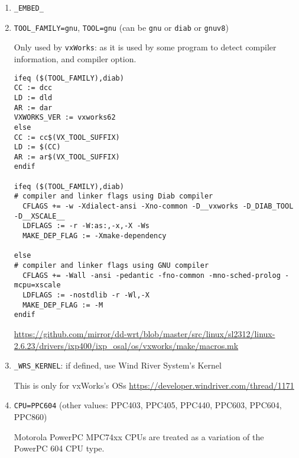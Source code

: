 \begin{enumerate}
  
  \item \verb!_EMBED_!
  
  \item \verb!TOOL_FAMILY=gnu!, \verb!TOOL=gnu! (can be \verb!gnu! or
  \verb!diab! or \verb!gnuv8!)
  
Only used by \verb!vxWorks!: as it is used by some program to detect compiler information, and compiler option.
\begin{verbatim}
ifeq ($(TOOL_FAMILY),diab)
CC := dcc
LD := dld
AR := dar
VXWORKS_VER := vxworks62
else
CC := cc$(VX_TOOL_SUFFIX)
LD := $(CC)
AR := ar$(VX_TOOL_SUFFIX)
endif

ifeq ($(TOOL_FAMILY),diab)
# compiler and linker flags using Diab compiler
  CFLAGS += -w -Xdialect-ansi -Xno-common -D__vxworks -D_DIAB_TOOL -D__XSCALE__
  LDFLAGS := -r -W:as:,-x,-X -Ws
  MAKE_DEP_FLAG := -Xmake-dependency

else
# compiler and linker flags using GNU compiler
  CFLAGS += -Wall -ansi -pedantic -fno-common -mno-sched-prolog -mcpu=xscale
  LDFLAGS := -nostdlib -r -Wl,-X
  MAKE_DEP_FLAG := -M
endif
\end{verbatim}
\url{https://github.com/mirror/dd-wrt/blob/master/src/linux/sl2312/linux-2.6.23/drivers/ixp400/ixp_osal/os/vxworks/make/macros.mk}

  
  \item \verb!_WRS_KERNEL!: if defined, use Wind River System's Kernel
  
  This is only for vxWorks's OSs
  \url{https://developer.windriver.com/thread/1171}
  
  \item \verb!CPU=PPC604! (other values: PPC403, PPC405, PPC440, PPC603,
  PPC604, PPC860)
  
  Motorola PowerPC MPC74xx CPUs are treated as a variation of the PowerPC 604
  CPU type.
  
\end{enumerate}

